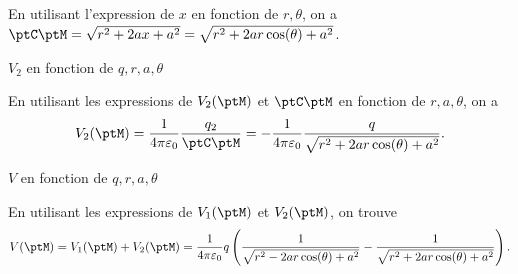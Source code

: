 \begin{corrige}
	En utilisant l'expression de $x$ en fonction de $r,\theta$, on a 
	$
		\ptC\ptM = \sqrt{r^2 + 2ax + a^2 }= \sqrt{ r^2  + 2ar \cos (\theta) + a^2 }
	$.
\end{corrige}






\begin{enonce}
	$V_2$ en fonction de $q, r, a, \theta$
\end{enonce}


\begin{corrige}
	En utilisant les expressions de $V_2(\ptM)$ et $\ptC\ptM$ en fonction de $r,a,\theta$, on a 
	\[
		V_2(\ptM) = \frac{1}{4\pi\varepsilon_0}\frac{q_2}{\ptC\ptM} = -\frac{1}{4\pi\varepsilon_0}\frac{q}{\sqrt{ r^2  + 2ar \cos (\theta) + a^2 }}.
		\]
\end{corrige}






\begin{enonce}
	$V$ en fonction de $q, r, a, \theta$
\end{enonce}


\begin{corrige}
	En utilisant les expressions de $V_1(\ptM)$ et $V_2(\ptM)$, on trouve
	\[
		V(\ptM) = V_1(\ptM) + V_2(\ptM) = \frac{1}{4\pi\varepsilon_0}q\left(\frac{1}{\sqrt{ r^2  - 2ar \cos (\theta) + a^2 }} -  \frac{1}{\sqrt{ r^2  + 2ar \cos (\theta) + a^2 }}  \right).
	\]
\end{corrige}




